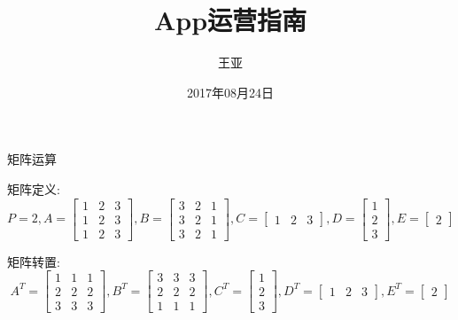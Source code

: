 \documentclass[UTF8,a4paper,notitlepage,openany,plain,final]{ctexbook}
\author{王亚}
\title{App运营指南}
\date{2017年08月24日}
\begin{document}
    \begin{center}
        \Large 矩阵运算
    \end{center}

    \columnseprule=1pt
    \begin{multicols}{4}
    \end{multicols}

    矩阵定义:
    \[
        P = 2 , A =
        \begin{bmatrix}
            1 & 2 & 3 \\
            1 & 2 & 3 \\
            1 & 2 & 3
        \end{bmatrix}
        , B =
        \begin{bmatrix}
            3 & 2 & 1 \\
            3 & 2 & 1 \\
            3 & 2 & 1
        \end{bmatrix}
        , C =
        \begin{bmatrix}
            1 & 2 & 3
        \end{bmatrix}
        , D =
        \begin{bmatrix}
            1\\
            2\\
            3
        \end{bmatrix}
        , E =
        \begin{bmatrix}
            2
        \end{bmatrix}
    \]
    
    矩阵转置:
    \[
        A^T =
        \begin{bmatrix}
            1 & 1 & 1 \\
            2 & 2 & 2 \\
            3 & 3 & 3
        \end{bmatrix}
        , B^T =
        \begin{bmatrix}
            3 & 3 & 3 \\
            2 & 2 & 2 \\
            1 & 1 & 1
        \end{bmatrix}
        , C^T =
        \begin{bmatrix}
            1 \\
            2 \\
            3
        \end{bmatrix}
        , D^T =
        \begin{bmatrix}
            1 & 2 & 3
        \end{bmatrix}
        , E^T =
        \begin{bmatrix}
            2
        \end{bmatrix}
    \]
\end{document}
